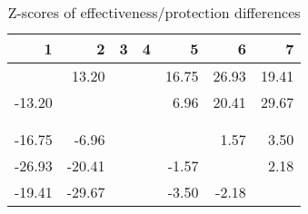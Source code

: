 \begin{table}[ht]
\centering
\begin{tabular}{rrrrrrr}
  \hline
1 & 2 & 3 & 4 & 5 & 6 & 7 \\ 
  \hline
 & 13.20 &  &  & 16.75 & 26.93 & 19.41 \\ 
  -13.20 &  &  &  & 6.96 & 20.41 & 29.67 \\ 
   &  &  &  &  &  &  \\ 
   &  &  &  &  &  &  \\ 
  -16.75 & -6.96 &  &  &  & 1.57 & 3.50 \\ 
  -26.93 & -20.41 &  &  & -1.57 &  & 2.18 \\ 
  -19.41 & -29.67 &  &  & -3.50 & -2.18 &  \\ 
   \hline
\end{tabular}
\caption{Z-scores of effectiveness/protection differences} 
\end{table}
